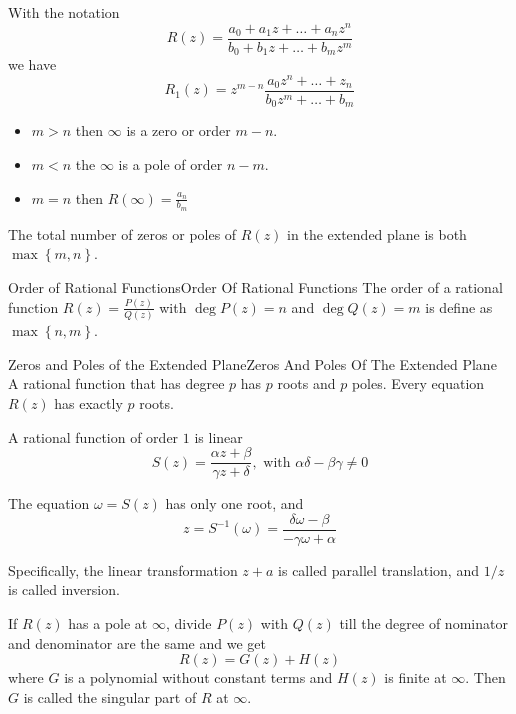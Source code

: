 \documentclass[../main.tex]{subfiles}
\begin{document}
With the notation 
\begin{equation*}
R(z) =\frac{a_0+a_1z+\ldots +a_nz^n}{b_0+b_1z+\ldots +b_mz^m}
\end{equation*}
we have
\begin{equation*}
R_1(z) = z^{m-n} \frac{a_0z^n+\ldots +z_n}{b_0z^m+\ldots +b_m}
\end{equation*}
\begin{itemize}
\item $m>n$ then $\infty $ is a zero or order $m-n$.
\item $m<n$ the $\infty $ is a pole of order $n-m$.
\item $m=n$ then $R(\infty ) = \frac{a_n}{b_m}$
\end{itemize}

The total number of zeros or poles of $R(z)$ in the extended plane is both $\max \left\{ m,n \right\}$.

\begin{definition}{Order of Rational Functions}{Order Of Rational Functions}
The  order of a rational function $\displaystyle R(z) = \frac{P(z)}{Q(z)}$ with $\deg P(z) = n$ and $\deg Q(z)=m$ is define as $\max \left\{ n,m \right\}$.
\end{definition}

\begin{theorem}{Zeros and Poles of the Extended Plane}{Zeros And Poles Of The Extended Plane}
A rational function that has degree $p$ has $p$ roots and $p$ poles. Every equation $R(z)$ has exactly $p$ roots.
\end{theorem}

A rational function of order  $1$ is linear
\begin{equation}
S(z) = \frac{\alpha z+\beta}{\gamma z+\delta}, \text{ with }\alpha \delta-\beta \gamma\neq 0
\end{equation}

The equation $\omega = S(z)$ has only one root, and 
\begin{equation*}
z = S^{-1}(\omega) = \frac{\delta \omega - \beta}{-\gamma \omega + \alpha}
\end{equation*}

Specifically, the linear transformation $z+a$ is called parallel translation, and $1 / z$ is called inversion.

If $R(z)$ has a pole at $\infty $, divide $P(z)$ with $Q(z)$ till the degree of nominator and denominator are the same and we get
\begin{equation*}
R(z) = G(z) + H(z)
\end{equation*}
where $G$ is a polynomial without constant terms and $H(z)$ is finite at $\infty $. Then $G$ is called the singular part of $R$ at $\infty $.
\end{document}
